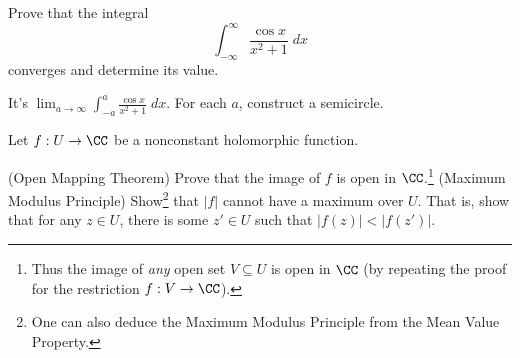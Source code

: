\begin{problem}
	\yod
	Prove that the integral
	\[
		\int_{-\infty}^{\infty} \frac{\cos x}{x^2+1} \; dx
	\]
	converges and determine its value.
	\begin{hint}
		It's $\lim_{a \to \infty} \int_{-a}^{a} \frac{\cos x}{x^2+1} \; dx$.
		For each $a$, construct a semicircle.
	\end{hint}

\end{problem}

\begin{sproblem}
	Let $f : U \to \CC$ be a nonconstant holomorphic function.
	\begin{enumerate}[(a)]
		\ii (Open Mapping Theorem)
		Prove that the image of $f$ is open in $\CC$.\footnote{%
			Thus the image of \emph{any}
			open set $V \subseteq U$ is open in $\CC$
			(by repeating the proof for the restriction $f : V \to \CC$).
		}
		\ii (Maximum Modulus Principle)
		Show\footnote{One can also deduce the Maximum Modulus Principle
		from the Mean Value Property.} that $\left\lvert f \right\rvert$
		cannot have a maximum over $U$.
		That is, show that for any $z \in U$, there is some $z' \in U$
		such that $\left\lvert f(z) \right\rvert < \left\lvert f(z') \right\rvert$.
	\end{enumerate}
\end{sproblem}
